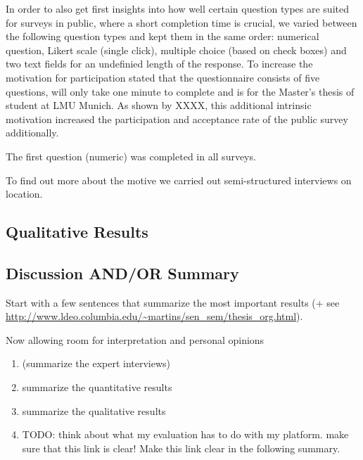 	In order to also get first insights into how well certain question types are suited for surveys in public, where a short completion time is crucial, we varied between the following question types and kept them in the same order: numerical question, Likert scale (single click), multiple choice (based on check boxes) and two text fields for an undefinied length of the response. To increase the motivation for participation stated that the questionnaire consists of five questions, will only take one minute to complete and is for the Master's thesis of student at LMU Munich.
	As shown by XXXX, this additional intrinsic motivation increased the participation and acceptance rate of the public survey additionally. 

	The first question (numeric) was completed in all surveys. 

	To find out more about the motive we carried out semi-structured interviews on location.


\subsection{Qualitative Results}




\subsection{Discussion AND/OR Summary}

	Start with a few sentences that summarize the most important results (+ see \url{http://www.ldeo.columbia.edu/~martins/sen_sem/thesis_org.html}).

	Now allowing room for interpretation and personal opinions

	\begin{enumerate}
	\item (summarize the expert interviews)
	\item summarize the quantitative results
	\item summarize the qualitative results 
	\item TODO: think about what my evaluation has to do with my platform. make sure that this link is clear! Make this link clear in the following summary.
	\end{enumerate}

